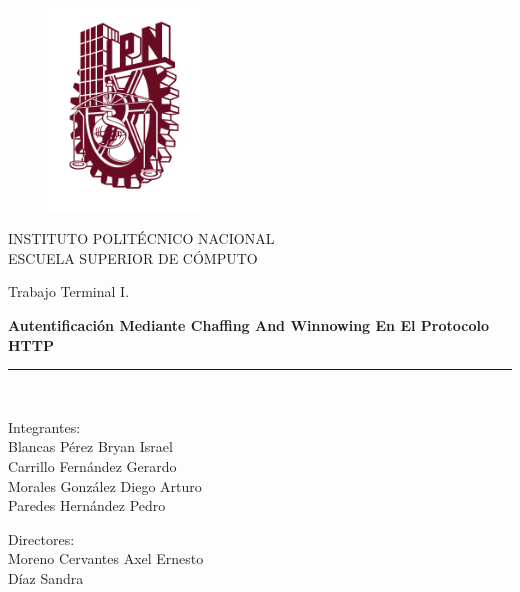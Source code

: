 \documentclass[12pt, a4paper, titlepage]{report}
\begin{document}
	
	\begin{titlepage}
		
		\vspace*{-1.5in}
		\begin{figure}[htb]
			\begin{center}
				\includegraphics[width=4cm]{./imagenes/logoipn.png}
			\end{center}
		\end{figure}
		
		\begin{center}
		INSTITUTO POLITÉCNICO NACIONAL\\
		\vspace*{0.2in}
		ESCUELA SUPERIOR DE CÓMPUTO\\
		\vspace*{0.6in}
		\begin{large}
			Trabajo Terminal I.\\
		\end{large}
		\vspace*{0.2in}
		\begin{Large}
			\textbf{Autentificación Mediante Chaffing And Winnowing En El Protocolo HTTP} \\
		\end{Large}
		\vspace*{0.3in}
		\rule{80mm}{0.1mm}\\
		\vspace*{0.1in}
		\begin{large}
			\begin{center}
				Integrantes:\\
				Blancas Pérez Bryan Israel\\
				Carrillo Fernández Gerardo\\
				Morales González Diego Arturo\\
				Paredes Hernández Pedro\\
			\end{center}
		\end{large}
		\begin{large}
			Directores:\\
			Moreno Cervantes Axel Ernesto\\
			Díaz Sandra\\
		\end{large}
		\end{center}

	\end{titlepage}
	
\end{document}
